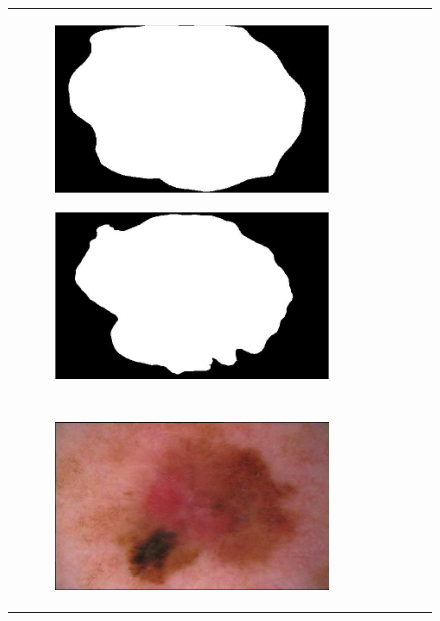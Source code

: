 \documentclass[a4paper, 10pt, conference]{ieeeconf}        %
\begin{document}
\begin{figure}[ht!]
\begin{tabular}{c c c c c}
\begin{subfigure}{0.2\textwidth}
      \end{subfigure} 
     \begin{subfigure}{0.2\textwidth}
      \includegraphics[scale=0.2]{expert_3GroundTrue_07.JPG}
      \end{subfigure} 
     \begin{subfigure}{0.2\textwidth}
      \includegraphics[scale=0.2]{finalGroundTrue_07.JPG}
      \end{subfigure} \\ \\
       \begin{subfigure}{0.2\textwidth}
       \includegraphics[scale=0.15]{original08.JPG}

\end{subfigure}
\end{tabular}
\end{figure}
\end{document}
